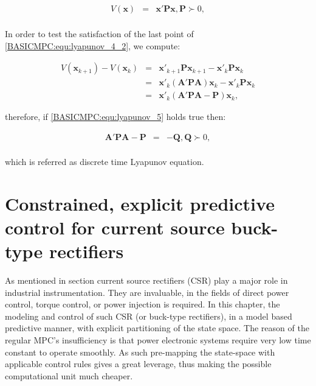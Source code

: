      \begin{equation}
        \begin{array}{rcl}
                V(\textbf{x})&=&\textbf{x}'\textbf{P}\textbf{x},\textbf{P}\succ 0,\\
            \end{array}
            \label{BASICMPC:equ:lyapunov_5}
        \end{equation}

    In order to test the satisfaction of the last point of \ref{BASICMPC:equ:lyapunov_4_2}, we compute:

    \begin{equation}
        \begin{array}{rcl}
                V(\textbf{x}_{k+1})-V(\textbf{x}_{k})&=&\textbf{x}'_{k+1}\textbf{P}\textbf{x}_{k+1}-\textbf{x}'_{k}\textbf{P}\textbf{x}_{k}\\
                &=&\textbf{x}'_{k}(\textbf{A}'\textbf{P}\textbf{A})\textbf{x}_{k}-\textbf{x}'_{k}\textbf{P}\textbf{x}_{k}\\
                &=&\textbf{x}'_{k}(\textbf{A}'\textbf{P}\textbf{A}-\textbf{P})\textbf{x}_{k},
            \end{array}
            \label{BASICMPC:equ:lyapunov_6}
        \end{equation}

    therefore, if \ref{BASICMPC:equ:lyapunov_5} holds true then:

    \begin{equation}
        \begin{array}{rcl}
                 \textbf{A}'\textbf{P}\textbf{A}-\textbf{P}&=&-\textbf{Q},\textbf{Q}\succ 0,\\
            \end{array}
            \label{BASICMPC:equ:lyapunov_7}
        \end{equation}

which is referred as discrete time Lyapunov equation.

\section[Predictive control of a CSR]{Constrained, explicit predictive control for current source buck-type rectifiers}\label{EMPC:sec:main}

As mentioned in section  current source rectifiers (CSR) play a major role in industrial instrumentation. They are invaluable, in the fields of direct power control, torque control, or power injection is required. In this chapter, the modeling and control of such CSR (or buck-type rectifiers), in a model based predictive manner, with explicit partitioning of the state space. The reason of the regular MPC's insufficiency is that power electronic systems require very low time constant to operate smoothly. As such pre-mapping the state-space with applicable control rules gives a great leverage, thus making the possible computational unit much cheaper.
		
